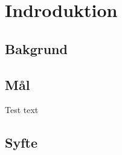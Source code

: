 \section{Indroduktion} %
\label{sec:indroduktion}

    \subsection{Bakgrund} %
    \label{sub:bakgrund}
    

    \subsection{Mål} %
    \label{sun:mal}
        Test text

    \subsection{Syfte} %
    \label{sub:syfte}
    
